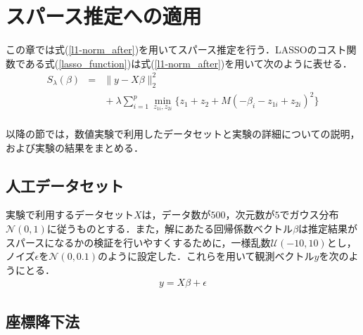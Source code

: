 \documentclass[technicalreport]{ieicej}
\begin{document}
\section{スパース推定への適用}
この章では式(\ref{l1-norm_after})を用いてスパース推定を行う．LASSOのコスト関数である式(\ref{lasso_function})は式(\ref{l1-norm_after})を用いて次のように表せる．
\begin{eqnarray}
  S_{\lambda}(\beta) &=& \|y-X\beta\|^{2}_{2} \nonumber \\
  & & \mbox{}+\lambda\sum^{p}_{i=1}{\min_{z_{1i},z_{2i}}{\{z_{1}+z_{2}+M(-\beta_{i}-z_{1i}+z_{2i})^{2}\}}} \nonumber \\
  \label{lasso_function_01}
\end{eqnarray}

以降の節では，数値実験で利用したデータセットと実験の詳細についての説明，および実験の結果をまとめる．

\subsection{人工データセット}
実験で利用するデータセット$X$は，データ数が$500$，次元数が$5$でガウス分布$\mathcal{N}(0,1)$に従うものとする．また，解にあたる回帰係数ベクトル$\beta$は推定結果がスパースになるかの検証を行いやすくするために，一様乱数$\mathcal{U}(-10,10)$とし，ノイズ$\epsilon$を$\mathcal{N}(0,0.1)$のように設定した．これらを用いて観測ベクトル$y$を次のようにとる．
\begin{eqnarray}
  y = X\beta +\epsilon
\end{eqnarray}

\subsection{座標降下法}
\end{document}
